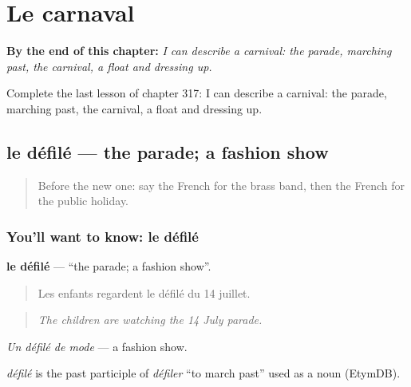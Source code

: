 
\chapter{Le carnaval}
\label{ch:fr-le-carnaval}

\begin{chapteropening}
\textbf{By the end of this chapter:} \emph{I can describe a carnival: the parade, marching past, the carnival, a float and dressing up.}

Complete the last lesson of chapter 317: I can describe a carnival: the parade, marching past, the carnival, a float and dressing up.
\end{chapteropening}

\section[le défilé]{le défilé — the parade; a fashion show}

\label{lesson:FR-C317-defile}



\begin{quote}
Before the new one: say the French for the brass band, then the French for the public holiday.
\end{quote}

\subsection*{You'll want to know: le défilé}
\textbf{le défilé} — \textquotedblleft{}the parade; a fashion show\textquotedblright{}.

\begin{quote}
Les enfants regardent le défilé du 14 juillet.
\end{quote}

\begin{quote}
\emph{The children are watching the 14 July parade.}
\end{quote}

\emph{Un défilé de mode} — a fashion show.

\begin{cousinweb}
\emph{défilé} is the past participle of \emph{défiler} \textquotedblleft{}to march past\textquotedblright{} used as a noun (EtymDB).
\end{cousinweb}


